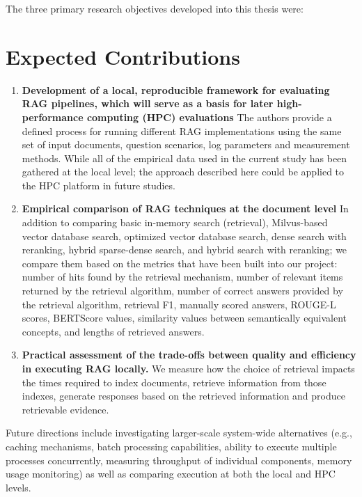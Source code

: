 The three primary research objectives developed into this thesis were:


\section{Expected Contributions}

\begin{enumerate}
    \item {\textbf{Development of a local, reproducible framework for evaluating \ac{RAG} pipelines, which will serve as a basis for later high-performance computing (\ac{HPC}) evaluations}} 
    The authors provide a defined process for running different \ac{RAG} implementations using the same set of input documents, question scenarios, log parameters and measurement methods. While all of the empirical data used in the current study has been gathered at the local level; the approach described here could be applied to the HPC platform in future studies.
    
    \item {\textbf{Empirical comparison of \ac{RAG} techniques at the document level}} 
    In addition to comparing basic in-memory search (retrieval), Milvus-based vector database search, optimized vector database search, dense search with reranking, hybrid sparse-dense search, and hybrid search with reranking; we compare them based on the metrics that have been built into our project: number of hits found by the retrieval mechanism, number of relevant items returned by the retrieval algorithm, number of correct answers provided by the retrieval algorithm, retrieval F1, manually scored answers, ROUGE-L scores, BERTScore values, similarity values between semantically equivalent concepts, and lengths of retrieved answers.
    
    \item {\textbf{Practical assessment of the trade-offs between quality and efficiency in executing \ac{RAG} locally.}} 
    We measure how the choice of retrieval impacts the times required to index documents, retrieve information from those indexes, generate responses based on the retrieved information and produce retrievable evidence.
\end{enumerate}

Future directions include investigating larger-scale system-wide alternatives (e.g., caching mechanisms, batch processing capabilities, ability to execute multiple processes concurrently, measuring throughput of individual components, memory usage monitoring) as well as comparing execution at both the local and HPC levels.

